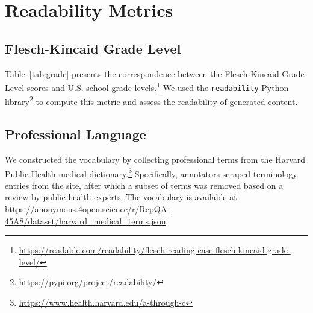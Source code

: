 \section{Readability Metrics}\label{app:metric}

\subsection{Flesch-Kincaid Grade Level}\label{app:grade}

Table~\ref{tab:grade} presents the correspondence between the Flesch-Kincaid Grade Level scores and U.S. school grade levels.\footnote{\url{https://readable.com/readability/flesch-reading-ease-flesch-kincaid-grade-level/}} We used the \texttt{readability} Python library\footnote{\url{https://pypi.org/project/readability/}} to compute this metric and assess the readability of generated content.

\begin{table}[h]
    \centering
    \caption{The relationship between Flesch-Kincaid grade level and grade level.}
    \label{tab:grade}
\end{table}

\subsection{Professional Language}\label{app:prof}

We constructed the vocabulary by collecting professional terms from the Harvard Public Health medical dictionary.\footnote{\url{https://www.health.harvard.edu/a-through-c}} Specifically, annotators scraped terminology entries from the site, after which a subset of terms was removed based on a review by public health experts.
The vocabulary is available at \url{https://anonymous.4open.science/r/RepQA-45A8/dataset/harvard_medical_terms.json}.

